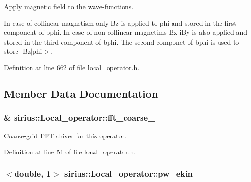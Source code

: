 Apply magnetic field to the wave-\/functions. 

In case of collinear magnetism only Bz is applied to {\ttfamily phi} and stored in the first component of {\ttfamily bphi}. In case of non-\/collinear magnetims Bx-\/i\+By is also applied and stored in the third component of {\ttfamily bphi}. The second componet of {\ttfamily bphi} is used to store -\/\+Bz$\vert$phi$>$. 

Definition at line 662 of file local\+\_\+operator.\+h.



\subsection{Member Data Documentation}
\hypertarget{classsirius_1_1_local__operator_aa1bc472b5b0e2ef1b496764db3feed92}{}
\subsubsection[{fft\+\_\+coarse\+\_\+}]{\& sirius\+::\+Local\+\_\+operator\+::fft\+\_\+coarse\+\_\+\hspace{0.3cm}{\ttfamily [private]}}\label{classsirius_1_1_local__operator_aa1bc472b5b0e2ef1b496764db3feed92}


Coarse-\/grid F\+F\+T driver for this operator. 



Definition at line 51 of file local\+\_\+operator.\+h.

\hypertarget{classsirius_1_1_local__operator_aedbceadfd55a100333a99a641aabf154}{}
\subsubsection[{pw\+\_\+ekin\+\_\+}]{$<$double, 1$>$ sirius\+::\+Local\+\_\+operator\+::pw\+\_\+ekin\+\_\+\hspace{0.3cm}{\ttfamily [private]}}\label{classsirius_1_1_local__operator_aedbceadfd55a100333a99a641aabf154}


